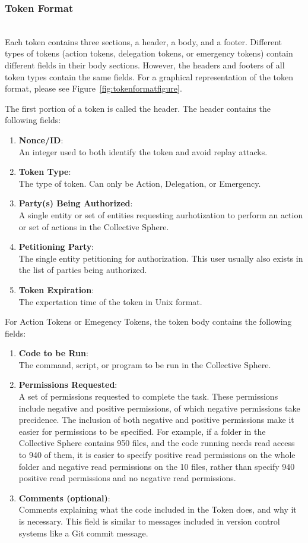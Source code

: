 \subsubsection{Token Format}
\label{sec:tokenformat}
\mbox{}\\
Each token contains three sections, a header, a body, and a footer. Different
types of tokens (action tokens, delegation tokens, or emergency tokens) contain
different fields in their body sections. However, the headers and footers of all
token types contain the same fields. For a graphical representation of the token
format, please see Figure~\ref{fig:tokenformatfigure}.

The first portion of a token is called the header. The header contains the
following fields:
\begin{enumerate}
\item \textbf{Nonce/ID}:\\ 
An integer used to both identify the token and avoid replay attacks.
\item \textbf{Token Type}:\\ 
The type of token. Can only be Action, Delegation, or Emergency.
\item \textbf{Party(s) Being Authorized}:\\
A single entity or set of entities requesting aurhotization to perform an action
or set of actions in the Collective Sphere.
\item \textbf{Petitioning Party}:\\
The single entity petitioning for authorization. This user usually also exists
in the list of parties being authorized.
\item \textbf{Token Expiration}:\\
The expertation time of the token in Unix format.
\end{enumerate}

For Action Tokens or Emegency Tokens, the token body contains the following
fields:
\begin{enumerate}
\item \textbf{Code to be Run}:\\
The command, script, or program to be run in the Collective Sphere.
\item \textbf{Permissions Requested}:\\
A set of permissions requested to complete the task. These permissions include
negative and positive permissions, of which negative permissions take
precidence. The inclusion of both negative and positive permissions make it
easier for permissions to be specified. For example, if a folder in the
Collective Sphere contains 950 files, and the code running needs read access to
940 of them, it is easier to specify positive read permissions on the whole
folder and negative read permissions on the 10 files, rather than specify 940
positive read permissions and no negative read permissions.
\item \textbf{Comments (optional)}:\\
Comments explaining what the code included in the Token does, and why it is
necessary. This field is similar to messages included in version control systems
like a Git commit message.
\end{enumerate}

